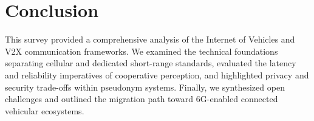 \section{Conclusion}
\label{sec:conclusion}

This survey provided a comprehensive analysis of the Internet of Vehicles and V2X communication frameworks.
We examined the technical foundations separating cellular and dedicated short-range standards, evaluated the latency and reliability imperatives of cooperative perception, and highlighted privacy and security trade-offs within pseudonym systems.
Finally, we synthesized open challenges and outlined the migration path toward 6G-enabled connected vehicular ecosystems.

